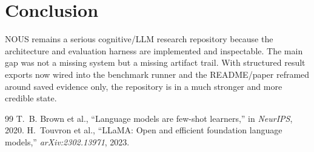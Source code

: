 \documentclass[conference]{IEEEtran}
\begin{document}
\section{Conclusion}

NOUS remains a serious cognitive/LLM research repository because the architecture
and evaluation harness are implemented and inspectable. The main gap was not a
missing system but a missing artifact trail. With structured result exports now
wired into the benchmark runner and the README/paper reframed around saved
evidence only, the repository is in a much stronger and more credible state.


\begin{thebibliography}{99}
T.~B. Brown et al., ``Language models are few-shot learners,'' in \textit{NeurIPS}, 2020.
H.~Touvron et al., ``LLaMA: Open and efficient foundation language models,'' \textit{arXiv:2302.13971}, 2023.
\end{thebibliography}
\end{document}
